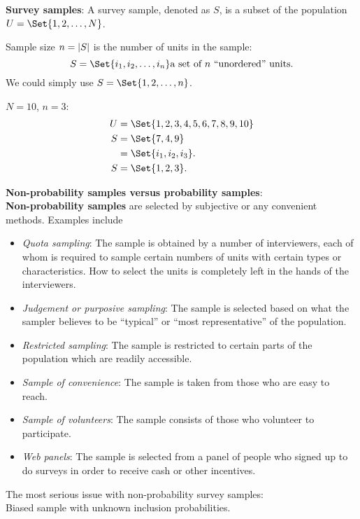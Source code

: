 
\textbf{Survey samples}:
A survey sample, denoted as $S$, is a subset of the population
$ U=\Set{1,2,\ldots,N} $.

Sample size $ n=\lvert S\rvert $ is the number
of units in the sample:
\[ S=\Set{i_1,i_2,\ldots,i_n}\text{a set of $n$ ``unordered'' units}. \]
We could simply use $ S=\Set{1,2,\ldots,n} $.

$ N=10 $, $ n=3 $:
\begin{align*}
      U & =\Set{1,2,3,4,5,6,7,8,9,10} \\
      S & =\Set{7,4,9}                \\
        & =\Set{i_1,i_2,i_3}.         \\
      S & =\Set{1,2,3}.
\end{align*}

\textbf{Non-probability samples versus probability samples}:\\
\textbf{Non-probability samples} are selected by subjective or any
convenient methods. Examples include
\begin{itemize}
      \item \emph{Quota sampling}: The sample is obtained by a number of
            interviewers, each of whom is required to sample certain
            numbers of units with certain types or characteristics. How to
            select the units is completely left in the hands of the interviewers.
      \item \emph{Judgement or purposive sampling}: The sample is selected based
            on what the sampler believes to be ``typical'' or ``most
            representative'' of the population.
      \item \emph{Restricted sampling}: The sample is restricted to certain parts of
            the population which are readily accessible.
      \item \emph{Sample of convenience}: The sample is taken from those who are
            easy to reach.
      \item \emph{Sample of volunteers}: The sample consists of those who
            volunteer to participate.
      \item \emph{Web panels}: The sample is selected from a panel of people who
            signed up to do surveys in order to receive cash or other
            incentives.
\end{itemize}

The most serious issue with non-probability survey samples:\\
Biased sample with unknown inclusion probabilities.

